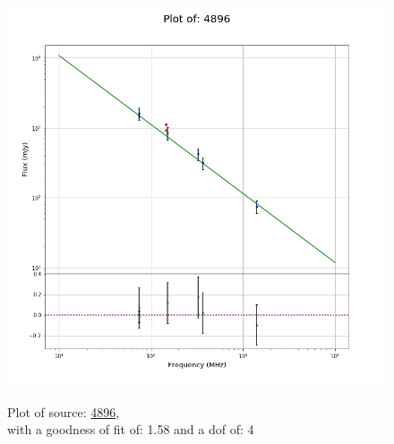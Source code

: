 \documentclass{article}
\begin{document}
\begin{figure}[H]
\begin{minipage}{0.5\textwidth}
        \includegraphics[scale = 0.35]{KmeulenSimSource_1hr/1hr4896.png}
        \captionsetup{labelformat=empty}
        \caption{Plot of source: \href{http://banana.transientskp.org/r4/vlo_KmeulenSimSource/runningcatalog/4896}{4896},\\with a goodness of fit of: 1.58 and a dof of: 4}
    \addtocounter{figure}{-1}
    \label{KmeulenSimSource:1hr:4896:plot}
    \end{minipage}
\end{figure}
\end{document}

